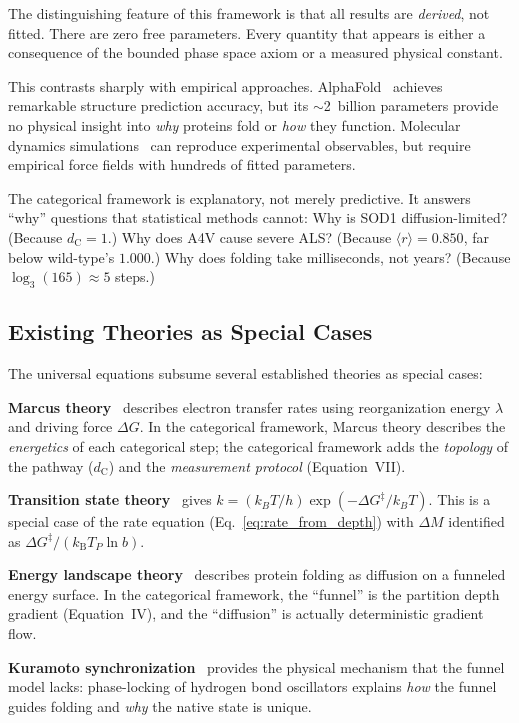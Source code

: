 \documentclass[aps,prx,superscriptaddress,twocolumn,10pt,a4paper,longbibliography,preprint]{revtex4-2}
\newcommand{\dC}{d_{\mathrm{C}}}
\newcommand{\kB}{k_{\mathrm{B}}}
\newcommand{\DG}{\Delta G^{\ddagger}}
\newcommand{\orderp}{\langle r \rangle}
\theoremstyle{definition}
\theoremstyle{remark}
\begin{document}
The distinguishing feature of this framework is that all results are \emph{derived}, not fitted. There are zero free parameters. Every quantity that appears is either a consequence of the bounded phase space axiom or a measured physical constant.

This contrasts sharply with empirical approaches. AlphaFold~\cite{Jumper2021} achieves remarkable structure prediction accuracy, but its $\sim$2~billion parameters provide no physical insight into \emph{why} proteins fold or \emph{how} they function. Molecular dynamics simulations~\cite{Karplus2002, Shaw2010} can reproduce experimental observables, but require empirical force fields with hundreds of fitted parameters.

The categorical framework is explanatory, not merely predictive. It answers ``why'' questions that statistical methods cannot: Why is SOD1 diffusion-limited? (Because $\dC = 1$.) Why does A4V cause severe ALS? (Because $\orderp = 0.850$, far below wild-type's $1.000$.) Why does folding take milliseconds, not years? (Because $\log_3(165) \approx 5$ steps.)

\subsection{Existing Theories as Special Cases}

The universal equations subsume several established theories as special cases:

\textbf{Marcus theory}~\cite{Marcus1956, Marcus1993} describes electron transfer rates using reorganization energy $\lambda$ and driving force $\Delta G$. In the categorical framework, Marcus theory describes the \emph{energetics} of each categorical step; the categorical framework adds the \emph{topology} of the pathway ($\dC$) and the \emph{measurement protocol} (Equation~VII).

\textbf{Transition state theory}~\cite{Eyring1935} gives $k = (k_BT/h)\exp(-\DG/k_BT)$. This is a special case of the rate equation (Eq.~\ref{eq:rate_from_depth}) with $\Delta M$ identified as $\DG/(\kB T_P \ln b)$.

\textbf{Energy landscape theory}~\cite{Bryngelson1995, Onuchic1997} describes protein folding as diffusion on a funneled energy surface. In the categorical framework, the ``funnel'' is the partition depth gradient (Equation~IV), and the ``diffusion'' is actually deterministic gradient flow.

\textbf{Kuramoto synchronization}~\cite{Kuramoto1984, Strogatz2000} provides the physical mechanism that the funnel model lacks: phase-locking of hydrogen bond oscillators explains \emph{how} the funnel guides folding and \emph{why} the native state is unique.
\end{document}

